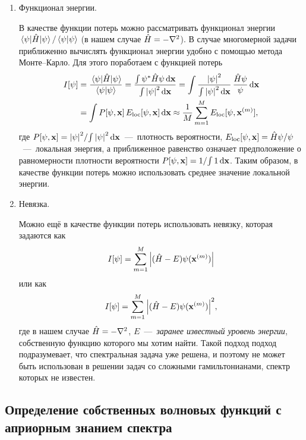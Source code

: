 \documentclass[11pt]{article}
\numberwithin{equation}{section}
\begin{document}
\begin{enumerate}
 \item Функционал энергии.

 В качестве функции потерь можно рассматривать функционал энергии $\mel{\psi}{\hat H}{\psi} / \ip{\psi}{\psi}$ (в нашем случае $\hat H = -\laplacian$). В случае многомерной задачи приближенно вычислять функционал энергии удобно с помощью метода Монте--Карло. Для этого поработаем с функцией потерь
 \begin{equation}
  \begin{split}
   I[\psi] &= \dfrac{\mel{\psi}{\hat H}{\psi}}{\ip{\psi}{\psi}} = \dfrac{\int \psi^* \hat H \psi \dd{\vb{x}}}{\int\abs{\psi}^2 \dd{\vb{x}}} = \int \dfrac{\abs{\psi}^2}{\int\abs{\psi}^2 \dd{\vb{x}}}\, \dfrac{\hat H \psi}{\psi} \dd{\vb{x}}\\
   &= \int P[\psi,\vb{x}]\, E_{\textrm{loc}}[\psi, \vb{x}] \dd{\vb{x}} \approx \dfrac{1}{M} \sum_{m=1}^M E_{\textrm{loc}}[\psi, \vb{x}^{(m)}],
  \end{split}
 \end{equation}
 где $P[\psi,\vb{x}] = {\abs{\psi}^2}/{\int\abs{\psi}^2 \dd{\vb{x}}}$~---~плотность вероятности, $E_{\textrm{loc}}[\psi, \vb{x}] = \hat H \psi / \psi$~---~локальная энергия, а приближенное равенство означает предположение о равномерности плотности вероятности $P[\psi,\vb{x}] = 1/{\int 1 \dd{\vb{x}}}$. Таким образом, в качестве функции потерь можно использовать среднее значение локальной энергии.

 \item Невязка.

 Можно ещё в качестве функции потерь использовать невязку, которая задаются как
 \begin{equation}
  I[\psi] = \sum_{m=1}^M \abs{(\hat H - E)\psi(\vb{x}^{(m)})}
  \label{eq:res_l1}
 \end{equation}
 или как
 \begin{equation}
  I[\psi] = \sum_{m=1}^M \abs{(\hat H - E)\psi(\vb{x}^{(m)})}^2,
 \end{equation}
 где в нашем случае $\hat H = -\laplacian$, $E$~---~\emph{заранее известный уровень энергии}, собственную функцию которого мы хотим найти. Такой подход подход подразумевает, что спектральная задача уже решена, и поэтому не может быть использован в решении задач со сложными гамильтонианами, спектр которых не известен.
\end{enumerate}

\subsection{Определение собственных волновых функций с априорным знанием спектра}
\label{subsec:test_laplac}
\end{document}
